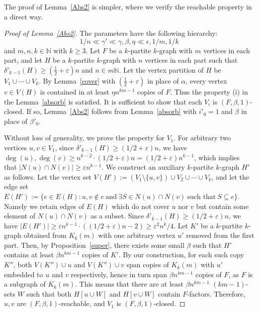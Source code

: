 \documentclass[11pt,a4paper]{article}
\theoremstyle{definition}
\begin{document}
The proof of Lemma~\ref{Abs2} is simpler, where we verify the reachable property in a direct way.
\begin{proof}[Proof of Lemma~\ref{Abs2}]
    The parameters have the following hierarchy:
    $$1/n \ll \gamma' \ll \gamma, \beta, \eta \ll \epsilon, 1/m, 1/k$$
    and $m, n, k\in \mathbb{N}$ with $k\geq 3$. Let $F$ be a $k$-partite $k$-graph with $m$ vertices in  each part, and let $H$ be a $k$-partite $k$-graph with $n$ vertices in each part such that $\delta'_{k-1}(H)\geq (\frac{1}{2}+\varepsilon) n$ and $n\in m\mathbb{N}$. Let the vertex partition of $H$ be $V_1\cup \cdots \cup V_k$. By Lemma~\ref{cover} with $(\frac{1}{2}+\varepsilon)$ in place of $\alpha$, every vertex $v\in V(H)$ is contained in at least $\eta n^{km-1}$ copies of $F$. Thus the property (i) in the Lemma~\ref{absorb} is satisfied. It is sufficient to show that each $V_i$ is $(F,\beta ,1)$-closed. If so, Lemma~\ref{Abs2} follows from Lemma~\ref{absorb} with $i'_0=1$ and $\beta$ in place of $\beta'_0$.

    Without loss of generality, we prove the property for $V_1$. For arbitrary two vertices $u,v\in V_1$, since $\delta'_{k-1}(H)\geq (1/2+\varepsilon) n$, we have $\deg(u), \deg(v)\geq n^{k-2}\cdot (1/2+\varepsilon) n=(1/2+\varepsilon)n^{k-1}$, which implies that $|N(u)\cap N(v)|\geq \varepsilon n^{k-1}$. We construct an auxiliary $k$-partite $k$-graph $H'$ as follows. Let the vertex set $V(H'):=(V_1\setminus\{u, v\})\cup V_2\cup \cdots \cup V_k$, and let the edge set $E(H'):=\{e\in E(H): u,v\notin e \ {\text{and}}\ \exists S\in N(u)\cap N(v)\ {\text{such that}}\ S\subseteq e\}$. Namely we retain edges of $E(H)$ which do not cover $u$ nor $v$ but contain some element of $N(u)\cap N(v)$ as a subset. Since $\delta'_{k-1}(H)\geq (1/2+\varepsilon) n$, we have $|E(H')|\geq \varepsilon n^{k-1}\cdot ((1/2+\varepsilon)n-2)\geq \varepsilon ^2 n^{k}/4$. Let $K'$ be a $k$-partite $k$-graph obtained from $K_k(m)$ with one arbitrary vertex $u'$ removed from the first part. Then, by Proposition~\ref{super}, there exists some small $\beta $ such that $H'$ contains at least $\beta n^{km-1}$ copies of $K'$. By our construction, for each such copy $K''$, both $V(K'')\cup u$ and $V(K'')\cup v$ span copies of $K_k(m)$ with $u'$ embedded to $u$ and $v$ respectively, hence in turn span $\beta n^{km-1}$ copies of $F$, as $F$ is a subgraph of $K_k(m)$.  This means that there are at least $\beta n^{km-1}$ $(km-1)$-sets $W$ such that both $H[u\cup W]$ and $H[v\cup W]$ contain $F$-factors. Therefore, $u,v$ are $(F,\beta ,1)$-reachable, and $V_1$ is $(F,\beta ,1)$-closed.



\end{proof}
\end{document}
